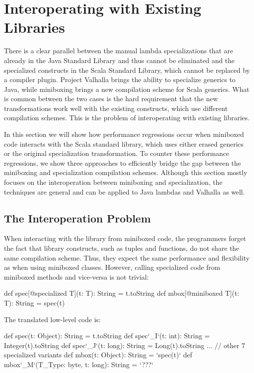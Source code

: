 \section{Interoperating with Existing Libraries}
\label{sec:library}

There is a clear parallel between the manual lambda specializations that are already in the Java Standard Library and thus cannot be eliminated and the specialized constructs in the Scala Standard Library, which cannot be replaced by a compiler plugin. Project Valhalla brings the ability to specialize generics to Java, while miniboxing brings a new compilation scheme for Scala generics. What is common between the two cases is the hard requirement that the new transformations work well with the existing constructs, which use different compilation schemes. This is the problem of interoperating with existing libraries.

In this section we will show how performance regressions occur when miniboxed code interacts with the Scala standard library, which uses either erased generics or the original specialization transformation. To counter these performance regressions, we show three approaches to efficiently bridge the gap between the miniboxing and specialization compilation schemes. Although this section mostly focuses on the interoperation between miniboxing and specialization, the techniques are general and can be applied to Java lambdas and Valhalla as well.

\subsection{The Interoperation Problem}

When interacting with the library from miniboxed code, the programmers forget the fact that library constructs, such as tuples and functions, do not share the same compilation scheme. Thus, they expect the same performance and flexibility as when using miniboxed classes. However, calling specialized code from miniboxed methods and vice-versa is not trivial:

\begin{lstlisting-nobreak}
 def spec[@specialized T](t: T): String = t.toString
 def mbox[@miniboxed T](t: T): String = spec(t)
\end{lstlisting-nobreak}

The translated low-level code is:

\begin{lstlisting-nobreak}
 def spec(t: Object): String = t.toString
 def spec`_I`(t: int): String = Integer(t).toString
 def spec`_J`(t: long): String = Long(t).toString
 ... // other 7 specialized variants
 def mbox(t: Object): String = `spec(t)`
 def mbox`_M`(T_Type: byte, t: long): String = `???`
\end{lstlisting-nobreak}

